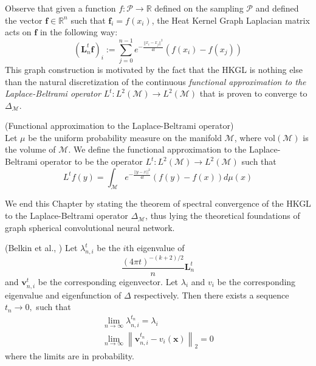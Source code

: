 Observe that given a function $f: \mathcal P \rightarrow \mathbb R$ defined on the sampling $ \mathcal P$ and defined the vector $\mathbf f\in\mathbb R^n$ such that $\mathbf f_i = f(x_i)$, the Heat Kernel Graph Laplacian matrix acts on $\mathbf f$ in the following way:
\begin{equation}\label{eq:HKGL}
(\mathbf L_n^t \mathbf f)_i:=  \sum_{j=0}^{n-1} e^{-\frac{||x_i-x_j||^2}{4t}}\left(f(x_i)-f(x_j)\right)
\end{equation}
This graph construction is motivated by the fact that the HKGL is nothing else than the natural discretization of the continuous \textit{functional approximation to the Laplace-Beltrami operator} $L^t:  L^{2}(\mathcal{M}) \rightarrow L^{2}(\mathcal{M})$ that is proven to converge to $\Delta_\mathcal M$.
\vspace{0.5cm}
\begin{definition}{}(\cite[Belkin et al.]{Belkin:2005:TTF:2138147.2138189}Functional approximation to the Laplace-Beltrami operator)\\ \label{eq: my L^t} Let $\mu$ be the uniform probability measure on the manifold $\mathcal M$, where $\text{vol}(\mathcal M)$ is the volume of $\mathcal M$. We define the functional approximation to the Laplace-Beltrami operator to be the operator $L^t: L^{2}(\mathcal{M}) \rightarrow L^{2}(\mathcal{M})$ such that
	\label{def:Functional approximation to the Laplace-Beltrami operator}
	$$ L^tf(y) = \int_{\mathcal M}e^{-\frac{||y-x||^2}{4t}}\left(f(y)-f(x)\right)d\mu(x)$$
\end{definition}
\vspace{0.5cm}

We end this Chapter by stating the theorem of spectral convergence of the HKGL to the Laplace-Beltrami operator $\Delta_\mathcal M$, thus lying the theoretical foundations of graph spherical convolutional neural network.
\vspace{1cm}
\begin{theorem}(Belkin et al., \cite{NIPS2006_2989})\label{theo:spectral convergence}
	Let \(\lambda_{n, i}^{t}\) be the $i$th eigenvalue of 
	$$
	\frac{(4\pi t)^{-(k+2)/2}}{n}\mathbf L^t_n
	$$
	and \(\mathbf v_{n, i}^{t}\) be the corresponding eigenvector. Let \(\lambda_{i}\) and \(v_{i}\) be the corresponding eigenvalue and eigenfunction of \(\Delta\) respectively. Then there exists a sequence \(t_{n} \rightarrow 0,\) such that
	\begin{equation}
	\begin{array}{c}{\lim _{n \rightarrow \infty} \lambda_{n, i}^{t_{n}}=\lambda_{i}} \\ 
	{\lim _{n \rightarrow \infty}\left\|\mathbf v_{n, i}^{t_{n}}-v_{i}(\mathbf x)\right\|_{2}=0}\end{array}
	\end{equation}
	where the limits are in probability.
\end{theorem}


